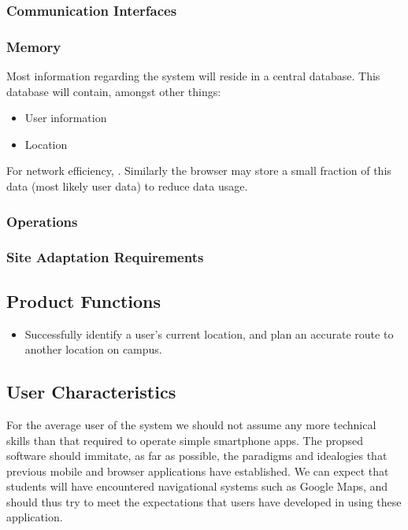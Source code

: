 \documentclass[10pt,a4paper]{article}
\begin{document}
			\subsubsection{Communication Interfaces}

			\subsubsection{Memory}

				Most information regarding the system will reside in a central
				database. This database will contain, amongst other things:

				\begin{itemize}
					\item User information
					\item Location
				\end{itemize}

				For network efficiency, . Similarly the browser may store a
				small fraction of this data (most likely user data) to reduce data usage.

			\subsubsection{Operations}



			\subsubsection{Site Adaptation Requirements}

		\subsection{Product Functions}

			\begin{itemize}
				\item Successfully identify a user's current location, and plan an
							accurate route to another location on campus.
			\end{itemize}

		\subsection{User Characteristics}

			For the average user of the system we should not assume any more technical
			skills than that required to operate simple smartphone apps. The propsed
			software should immitate, as far as possible, the paradigms and idealogies
			that previous mobile and browser applications have established. We can
			expect that students will have encountered navigational systems such as
			Google Maps, and should thus try to meet the expectations that users have
			developed in using these application.
\end{document}
